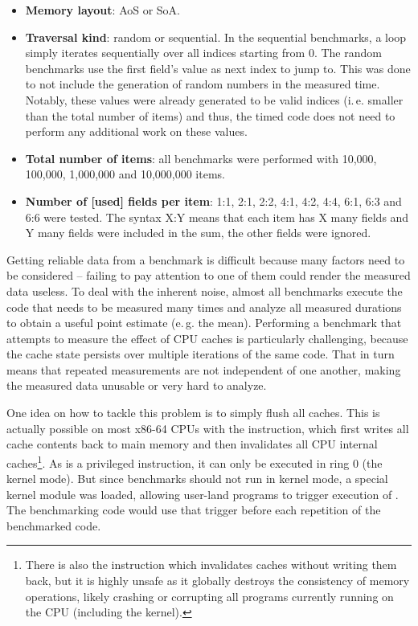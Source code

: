 \begin{itemize}
  \item \textbf{Memory layout}: AoS or SoA.
  \item \textbf{Traversal kind}: random or sequential.
  In the sequential benchmarks, a loop simply iterates sequentially over all indices starting from 0.
  The random benchmarks use the first field's  value as next index to jump to.
  This was done to not include the generation of random numbers in the measured time.
  Notably, these  values were already generated to be valid indices (i.\,e. smaller than the total number of items) and thus, the timed code does not need to perform any additional work on these values.
  \item \textbf{Total number of items}: all benchmarks were performed with 10,000, 100,000, 1,000,000 and 10,000,000 items.
  \item \textbf{Number of [used] fields per item}: 1:1, 2:1, 2:2, 4:1, 4:2, 4:4, 6:1, 6:3 and 6:6 were tested.
  The syntax X:Y means that each item has X many fields and Y many fields were included in the sum, the other fields were ignored.
\end{itemize}

\vfill

Getting reliable data from a benchmark is difficult because many factors need to be considered -- failing to pay attention to one of them could render the measured data useless.
To deal with the inherent noise, almost all benchmarks execute the code that needs to be measured many times and analyze all measured durations to obtain a useful point estimate (e.\,g. the mean).
Performing a benchmark that attempts to measure the effect of CPU caches is particularly challenging, because the cache state persists over multiple iterations of the same code.
That in turn means that repeated measurements are not independent of one another, making the measured data unusable or very hard to analyze.

\newpage
One idea on how to tackle this problem is to simply flush all caches.
This is actually possible on most x86-64 CPUs with the  instruction, which first writes all cache contents back to main memory and then invalidates all CPU internal caches\footnote{There is also the  instruction which invalidates caches without writing them back, but it is highly unsafe as it globally destroys the consistency of memory operations, likely crashing or corrupting all programs currently running on the CPU (including the kernel).}.
As  is a privileged instruction, it can only be executed in ring 0 (the kernel mode).
But since benchmarks should not run in kernel mode, a special kernel module was loaded, allowing user-land programs to trigger execution of .
The benchmarking code would use that trigger before each repetition of the benchmarked code.

